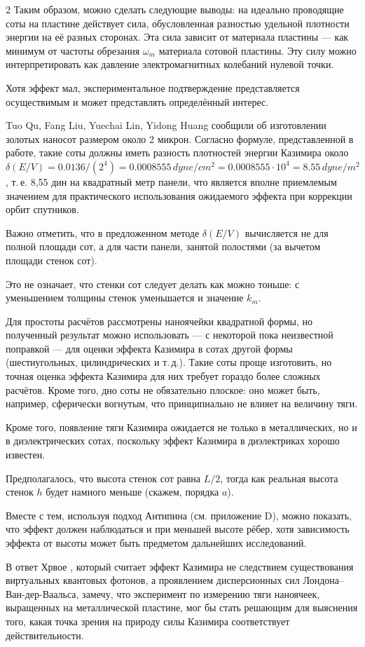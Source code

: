\documentclass[twoside, 10pt]{article}
\begin{document}
\begin{multicols}{2}
    Таким образом, можно сделать следующие выводы: на идеально проводящие соты на пластине действует сила, обусловленная разностью удельной плотности энергии на её разных сторонах. Эта сила зависит от материала пластины — как минимум от частоты обрезания \(\omega_m\) материала сотовой пластины. Эту силу можно интерпретировать как давление электромагнитных колебаний нулевой точки.

    Хотя эффект мал, экспериментальное подтверждение представляется осуществимым и может представлять определённый интерес.

    Tuo Qu, Fang Liu, Yuechai Lin, Yidong Huang \cite{Tuo2019} сообщили об изготовлении золотых наносот размером около 2 микрон. Согласно формуле, представленной в работе, такие соты должны иметь разность плотностей энергии Казимира около
\(\delta\left(E/V\right) = 0.0136/({2^4}) = 0.0008555\,dyne/cm^2 = 0.0008555 \cdot 10^4 = 8.55\,dyne/m^2\),
т.\,е. 8,55 дин на квадратный метр панели, что является вполне приемлемым значением для практического использования ожидаемого эффекта при коррекции орбит спутников.

    Важно отметить, что в предложенном методе \(\delta\left(E/V\right)\) вычисляется не для полной площади сот, а для части панели, занятой полостями (за вычетом площади стенок сот).

    Это не означает, что стенки сот следует делать как можно тоньше: с уменьшением толщины стенок уменьшается и значение \(k_m\).

    Для простоты расчётов рассмотрены наноячейки квадратной формы, но полученный результат можно использовать — с некоторой пока неизвестной поправкой — для оценки эффекта Казимира в сотах другой формы (шестиугольных, цилиндрических и т.\,д.). Такие соты проще изготовить, но точная оценка эффекта Казимира для них требует гораздо более сложных расчётов. Кроме того, дно соты не обязательно плоское: оно может быть, например, сферически вогнутым, что принципиально не влияет на величину тяги.

    Кроме того, появление тяги Казимира ожидается не только в металлических, но и в диэлектрических сотах, поскольку эффект Казимира в диэлектриках хорошо известен.

    Предполагалось, что высота стенок сот равна \(L/2\), тогда как реальная высота стенок \(h\) будет намного меньше (скажем, порядка \(a\)).

    Вместе с тем, используя подход Антипина (см. приложение D), можно показать, что эффект должен наблюдаться и при меньшей высоте рёбер, хотя зависимость эффекта от высоты может быть предметом дальнейших исследований.

    В ответ Хрвое \cite{Hrvoje2016}, который считает эффект Казимира не следствием существования виртуальных квантовых фотонов, а проявлением дисперсионных сил Лондона–Ван-дер-Ваальса, замечу, что эксперимент по измерению тяги наноячеек, выращенных на металлической пластине, мог бы стать решающим для выяснения того, какая точка зрения на природу силы Казимира соответствует действительности.

\end{multicols}
\end{document}
